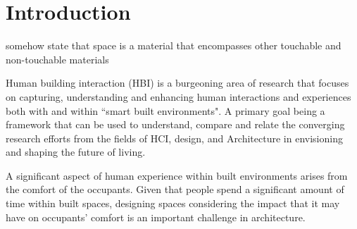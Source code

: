 \documentclass[acmconf, anonymous, review]{acmart}
\begin{document}



\maketitle

\section{Introduction}

{\color{red}somehow state that space is a material that encompasses other touchable and non-touchable materials}

Human building interaction (HBI) is a burgeoning area of research that focuses on capturing, understanding and enhancing human interactions and experiences both with and within ``smart built environments". A primary goal being a framework that can be used to understand, compare and relate the converging research efforts from the fields of HCI, design, and Architecture in envisioning and shaping the future of living. 

A significant aspect of human experience within built environments arises from the comfort of the occupants. Given that people spend a significant amount of time within built spaces, designing spaces considering the impact that it may have on occupants’ comfort is an important challenge in architecture. 
\end{document}
